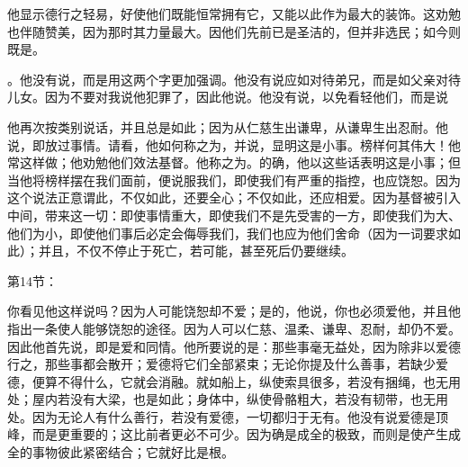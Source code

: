 他显示德行之轻易，好使他们既能恒常拥有它，又能以此作为最大的装饰。这劝勉也伴随赞美，因为那时其力量最大。因他们先前已是圣洁的，但并非选民；如今则既是。\par

。他没有说，而是用这两个字更加强调。他没有说应如对待弟兄，而是如父亲对待儿女。因为不要对我说他犯罪了，因此他说。他没有说，以免看轻他们，而是说\par

他再次按类别说话，并且总是如此；因为从仁慈生出谦卑，从谦卑生出忍耐。他说，即放过事情。请看，他如何称之为，并说，显明这是小事。榜样何其伟大！他常这样做；他劝勉他们效法基督。他称之为。的确，他以这些话表明这是小事；但当他将榜样摆在我们面前，便说服我们，即使我们有严重的指控，也应饶恕。因为这个说法正意谓此，不仅如此，还要全心；不仅如此，还应相爱。因为基督被引入中间，带来这一切：即使事情重大，即使我们不是先受害的一方，即使我们为大、他们为小，即使他们事后必定会侮辱我们，我们也应为他们舍命（因为一词要求如此）；并且，不仅不停止于死亡，若可能，甚至死后仍要继续。\par

第14节：\par

你看见他这样说吗？因为人可能饶恕却不爱；是的，他说，你也必须爱他，并且他指出一条使人能够饶恕的途径。因为人可以仁慈、温柔、谦卑、忍耐，却仍不爱。因此他首先说，即是爱和同情。他所要说的是：那些事毫无益处，因为除非以爱德行之，那些事都会散开；爱德将它们全部紧束；无论你提及什么善事，若缺少爱德，便算不得什么，它就会消融。就如船上，纵使索具很多，若没有捆绳，也无用处；屋内若没有大梁，也是如此；身体中，纵使骨骼粗大，若没有韧带，也无用处。因为无论人有什么善行，若没有爱德，一切都归于无有。他没有说爱德是顶峰，而是更重要的；这比前者更必不可少。因为确是成全的极致，而则是使产生成全的事物彼此紧密结合；它就好比是根。\par

\par

